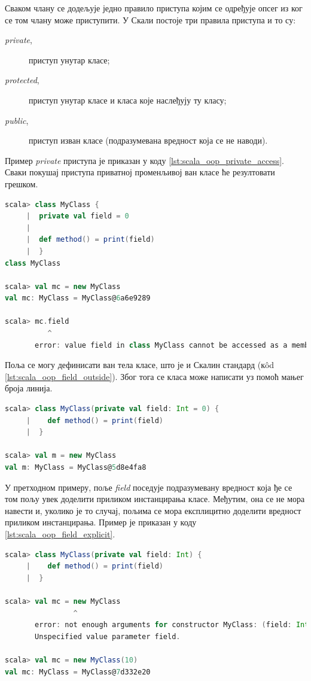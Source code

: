 \documentclass[12pt,oneside]{memoir}
\begin{document}
Сваком члану се додељује једно правило приступа којим се одређује опсег из ког се том члану може приступити. У Скали постоје три правила приступа и то су:

\begin{description}
\item[\textit{private},] приступ унутар класе;
\item[\textit{protected},] приступ унутар класе и класа које наслеђују ту класу;
\item[\textit{public},] приступ изван класе (подразумевана вредност која се не наводи).
\end{description}

Пример \textit{private} приступа је приказан у коду \ref{lst:scala_oop_private_access}. Сваки покушај приступа приватној променљивој ван класе ће резултовати грешком.

\begin{lstlisting}[language=Scala, caption={Пример private правила приступа}, label={lst:scala_oop_private_access}]
scala> class MyClass {
     |  private val field = 0
     |    
     |  def method() = print(field)
     |  }
class MyClass

scala> val mc = new MyClass
val mc: MyClass = MyClass@6a6e9289

scala> mc.field
          ^
       error: value field in class MyClass cannot be accessed as a member of MyClass from class 
\end{lstlisting}

Поља се могу дефинисати ван тела класе, што је и Скалин стандард (к\^ od \ref{lst:scala_oop_field_outside}). Због тога се класа може написати уз помоћ мањег броја линија. 

\begin{lstlisting}[language=Scala, caption={Дефиниција поља ван тела класе}, label={lst:scala_oop_field_outside}]
scala> class MyClass(private val field: Int = 0) {
     |    def method() = print(field)
     |  }

scala> val m = new MyClass
val m: MyClass = MyClass@5d8e4fa8
\end{lstlisting}

У претходном примеру, поље \textit{field} поседује подразумевану вредност која ђе се том пољу увек доделити приликом инстанцирања класе. Међутим, она се не мора навести и, уколико је то случај, пољима се мора експлицитно доделити вредност приликом инстанцирања. Пример је приказан у коду \ref{lst:scala_oop_field_explicit}. \cite{scala_prog}

\begin{lstlisting}[language=Scala, caption={Инстанцирање класе без подразумеваних вредности поља}, label={lst:scala_oop_field_explicit}]
scala> class MyClass(private val field: Int) {
     |    def method() = print(field)
     |  }

scala> val mc = new MyClass
                ^
       error: not enough arguments for constructor MyClass: (field: Int): MyClass.
       Unspecified value parameter field.
     
scala> val mc = new MyClass(10)
val mc: MyClass = MyClass@7d332e20
\end{lstlisting}
\end{document}
